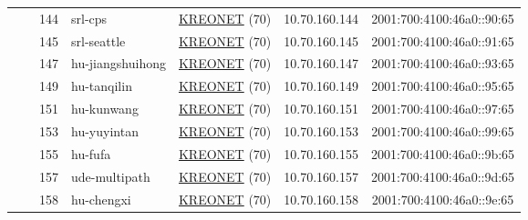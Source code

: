 \begin{small}
\begin{center}
\begin{longtable}{|c|c|c|c|c|c|c|c|}
  &  & \tiny{144} & \multicolumn{1}{|l|}{\tiny{srl-cps}} & \multicolumn{2}{|c|}{\tiny{\href{http://www.kreonet.net}{KREONET} (70)}} & \tiny{10.70.160.144} & \tiny{2001:700:4100:46a0::90:65} \\* \cline{3-3}\cline{4-4}\cline{5-5}\cline{6-6}\cline{7-7}\cline{8-8}
  &  & \tiny{145} & \multicolumn{1}{|l|}{\tiny{srl-seattle}} & \multicolumn{2}{|c|}{\tiny{\href{http://www.kreonet.net}{KREONET} (70)}} & \tiny{10.70.160.145} & \tiny{2001:700:4100:46a0::91:65} \\* \cline{3-3}\cline{4-4}\cline{5-5}\cline{6-6}\cline{7-7}\cline{8-8}
  &  & \tiny{147} & \multicolumn{1}{|l|}{\tiny{hu-jiangshuihong}} & \multicolumn{2}{|c|}{\tiny{\href{http://www.kreonet.net}{KREONET} (70)}} & \tiny{10.70.160.147} & \tiny{2001:700:4100:46a0::93:65} \\* \cline{3-3}\cline{4-4}\cline{5-5}\cline{6-6}\cline{7-7}\cline{8-8}
  &  & \tiny{149} & \multicolumn{1}{|l|}{\tiny{hu-tanqilin}} & \multicolumn{2}{|c|}{\tiny{\href{http://www.kreonet.net}{KREONET} (70)}} & \tiny{10.70.160.149} & \tiny{2001:700:4100:46a0::95:65} \\* \cline{3-3}\cline{4-4}\cline{5-5}\cline{6-6}\cline{7-7}\cline{8-8}
  &  & \tiny{151} & \multicolumn{1}{|l|}{\tiny{hu-kunwang}} & \multicolumn{2}{|c|}{\tiny{\href{http://www.kreonet.net}{KREONET} (70)}} & \tiny{10.70.160.151} & \tiny{2001:700:4100:46a0::97:65} \\* \cline{3-3}\cline{4-4}\cline{5-5}\cline{6-6}\cline{7-7}\cline{8-8}
  &  & \tiny{153} & \multicolumn{1}{|l|}{\tiny{hu-yuyintan}} & \multicolumn{2}{|c|}{\tiny{\href{http://www.kreonet.net}{KREONET} (70)}} & \tiny{10.70.160.153} & \tiny{2001:700:4100:46a0::99:65} \\* \cline{3-3}\cline{4-4}\cline{5-5}\cline{6-6}\cline{7-7}\cline{8-8}
  &  & \tiny{155} & \multicolumn{1}{|l|}{\tiny{hu-fufa}} & \multicolumn{2}{|c|}{\tiny{\href{http://www.kreonet.net}{KREONET} (70)}} & \tiny{10.70.160.155} & \tiny{2001:700:4100:46a0::9b:65} \\* \cline{3-3}\cline{4-4}\cline{5-5}\cline{6-6}\cline{7-7}\cline{8-8}
  &  & \tiny{157} & \multicolumn{1}{|l|}{\tiny{ude-multipath}} & \multicolumn{2}{|c|}{\tiny{\href{http://www.kreonet.net}{KREONET} (70)}} & \tiny{10.70.160.157} & \tiny{2001:700:4100:46a0::9d:65} \\* \cline{3-3}\cline{4-4}\cline{5-5}\cline{6-6}\cline{7-7}\cline{8-8}
  &  & \tiny{158} & \multicolumn{1}{|l|}{\tiny{hu-chengxi}} & \multicolumn{2}{|c|}{\tiny{\href{http://www.kreonet.net}{KREONET} (70)}} & \tiny{10.70.160.158} & \tiny{2001:700:4100:46a0::9e:65} \\* \cline{3-3}\cline{4-4}\cline{5-5}\cline{6-6}\cline{7-7}\cline{8-8}

\end{longtable}
\end{center}
\end{small}
